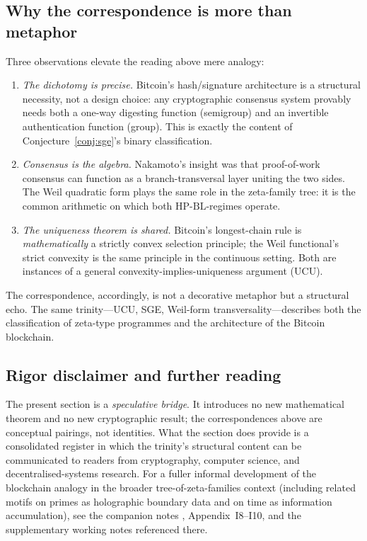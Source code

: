 \documentclass[11pt]{article}
\theoremstyle{definition}
\theoremstyle{remark}
\newcommand{\HBL}{\mathrm{HP\text{-}BL}}
\begin{document}
\subsection{Why the correspondence is more than metaphor}
\label{sec:blockchain-substance}

Three observations elevate the reading above mere analogy:

\begin{enumerate}
\item \emph{The dichotomy is precise.} Bitcoin's hash/signature
architecture is a structural necessity, not a design choice: any
cryptographic consensus system provably needs both a one-way
digesting function (semigroup) and an invertible authentication
function (group). This is exactly the content of
Conjecture~\ref{conj:sge}'s binary classification.

\item \emph{Consensus is the algebra.} Nakamoto's insight was that
proof-of-work consensus can function as a branch-transversal layer
uniting the two sides. The Weil quadratic form plays the same role
in the zeta-family tree: it is the common arithmetic on which both
$\HBL$-regimes operate.

\item \emph{The uniqueness theorem is shared.} Bitcoin's longest-chain
rule is \emph{mathematically} a strictly convex selection principle;
the Weil functional's strict convexity is the same principle in the
continuous setting. Both are instances of a general convexity-implies-uniqueness
argument (UCU).
\end{enumerate}

The correspondence, accordingly, is not a decorative metaphor but a
structural echo. The same trinity---UCU, SGE, Weil-form
transversality---describes both the classification of zeta-type
programmes and the architecture of the Bitcoin blockchain.

\subsection{Rigor disclaimer and further reading}
\label{sec:blockchain-disclaimer}

The present section is a \emph{speculative bridge}. It introduces
no new mathematical theorem and no new cryptographic result; the
correspondences above are conceptual pairings, not identities.
What the section does provide is a consolidated register in which
the trinity's structural content can be communicated to readers
from cryptography, computer science, and decentralised-systems
research. For a fuller informal development of the blockchain
analogy in the broader tree-of-zeta-families context (including
related motifs on primes as holographic boundary data and on time
as information accumulation), see the companion notes
\cite{MetaGalerkinBridge}, Appendix~I8--I10, and the supplementary
working notes referenced there.
\end{document}
